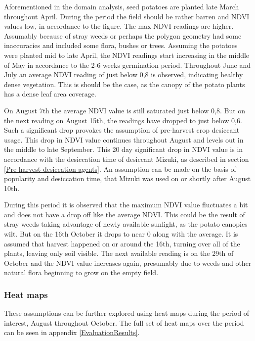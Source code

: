Aforementioned in the domain analysis, seed potatoes are planted late March throughout April. During the period the field should be rather barren and NDVI values low, in accordance to the figure. The max NDVI readings are higher. Assumably because of stray weeds or perhaps the polygon geometry had some inaccuracies and  included some flora, bushes or trees. Assuming the potatoes were planted mid to late April, the NDVI readings start increasing in the middle of May in accordance to the 2-6 weeks germination period. Throughout June and July an average NDVI reading of just below 0,8 is observed, indicating healthy dense vegetation. This is should be the case, as the canopy of the potato plants has a dense leaf area coverage.

On August 7th the average NDVI value is still saturated just below 0,8. But on the next reading on August 15th, the readings have dropped to just below 0,6. Such a significant drop provokes the assumption of pre-harvest crop desiccant usage. This drop in NDVI value continues throughout August and levels out in the middle to late September. This 20 day significant drop in NDVI value is in accordance with the desiccation time of desiccant Mizuki, as described in section \ref{Pre-harvest desiccation agents}. An assumption can be made on the basis of popularity and desiccation time, that Mizuki was used on or shortly after August 10th.

During this period it is observed that the maximum NDVI value fluctuates a bit and does not have a drop off like the average NDVI. This could be the result of stray weeds taking advantage of newly available sunlight, as the potato canopies wilt. But on the 16th October it drops to near 0 along with the average. It is assumed that harvest happened on or around the 16th, turning over all of the plants, leaving only soil visible. The next available reading is on the 29th of October and the NDVI value increases again, presumably due to weeds and other natural flora beginning to grow on the empty field.

\subsubsection{Heat maps}
These assumptions can be further explored using heat maps during the period of interest, August throughout October. The full set of heat maps over the period can be seen in appendix \ref{EvaluationResults}. 

